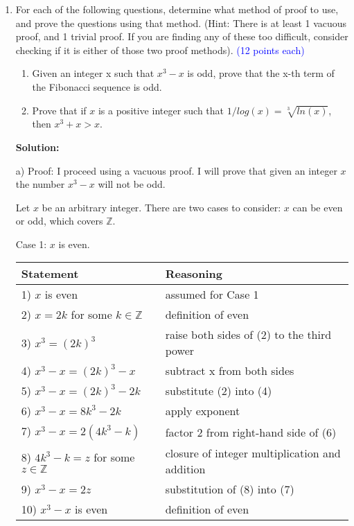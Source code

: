 \documentclass{article}
\newcommand{\pte}[1]{\textcolor{blue}{(#1 points each)}}
\newenvironment{solution}
{
\par
\color{blue}
\textbf{Solution:}
}
{
\par
}
\begin{document}
\begin{enumerate}
\begin{solution}
    Therefore by direct proof, I have shown that if $x$ is even, then $x^2 + 4x + 2$ is even. This completes the proof. $\square$
    
    \end{solution}
    \color{black}
    
    \item For each of the following questions, determine what method of proof to use, and prove the questions using that method. (Hint: There is at least 1 vacuous proof, and 1 trivial proof. If you are finding any of these too difficult, consider checking if it is either of those two proof methods). \pte{12}
    \begin{enumerate}
        \item Given an integer x such that $x^3 - x$ is odd, prove that the x-th term of the Fibonacci sequence is odd.
        \item Prove that if $x$ is a positive integer such that $1/log(x) = \sqrt[3]{ln(x)}$, then $x^3 +x > x$.
    \end{enumerate}
    \color{blue}
    \begin{solution}
    
    a) Proof: I proceed using a vacuous proof. I will prove that given an integer $x$ the number $x^3 - x$ will not be odd.
    
    Let $x$ be an arbitrary integer. There are two cases to consider: $x$ can be even or odd, which covers $\mathbb{Z}$.

    Case 1: $x$ is even.
    
    \begin{tabular}{l|l}
    Statement & Reasoning \\ \hline
    1) $x$ is even & assumed for Case 1\\
    2) $x = 2k$ for some $k \in \mathbb{Z}$ & definition of even\\
    3) $x^3 = (2k)^3$ & raise both sides of (2) to the third power\\
    4) $x^3 - x = (2k)^3 - x$ & subtract x from both sides\\
    5) $x^3 - x = (2k)^3 - 2k$ & substitute (2) into (4)\\
    6) $x^3 - x = 8k^3 - 2k$ & apply exponent\\
    7) $x^3 - x = 2(4k^3 - k)$ & factor 2 from right-hand side of (6)\\
    8) $4k^3 - k = z$ for some $z \in \mathbb{Z}$ & closure of integer multiplication and addition\\
    9) $x^3 - x = 2z$ & substitution of (8) into (7)\\
    10) $x^3 - x$ is even & definition of even
    \end{tabular}
    

\end{solution}
\end{enumerate}
\end{document}
